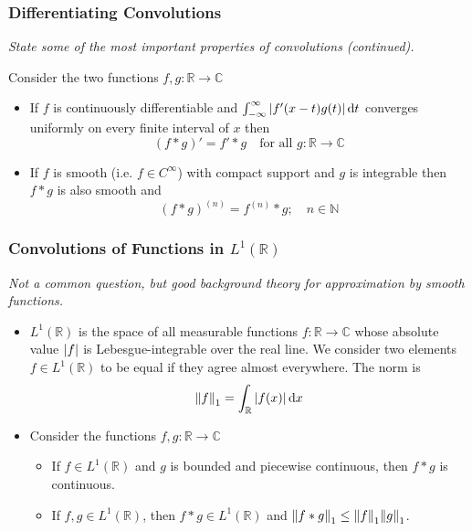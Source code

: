 \documentclass[11pt, a4paper]{article}
\newcommand{\question}[1]{\textit{#1}\vspace{2mm}}
\newcommand{\R}{\mathbb{R}} %
\newcommand{\C}{\mathbb{C}} %
\newcommand{\diff}{\mathop{}\!\mathrm{d}} %
\begin{document}
\subsubsection{Differentiating Convolutions}
\question{State some of the most important properties of convolutions (continued).}

Consider the two functions $ f, g:\R \to \C $ 
\begin{itemize}
	\item If $ f $ is continuously differentiable and $ \int_{-\infty}^{\infty} \abs{f'(x-t)g(t)}\diff t$ converges uniformly on every finite interval of $ x $ then 
	\begin{equation*}
		(f*g)' = f'*g \quad \text{for all } g:\R \to \C
	\end{equation*}
	
	\item If $ f $ is smooth (i.e. $ f \in C^{\infty} $) with compact support and $ g $ is integrable then $ f*g $ is also smooth and
	\begin{equation*}
		(f*g)^{(n)} = f^{(n)} * g; \quad n \in \mathbb{N}
	\end{equation*}
\end{itemize}



\subsubsection{Convolutions of Functions in $ L^1(\R) $}
\question{Not a common question, but good background theory for approximation by smooth functions.}
\begin{itemize}
	\item 	$ L^1(\R) $ is the space of all measurable functions $ f : \R \to \C $ whose absolute value $ \abs{f} $ is Lebesgue-integrable over the real line. We consider two elements $ f \in L^{1}(\R) $ to be equal if they agree almost everywhere. The norm is
	\begin{equation*}
		\norm{f}_{1} = \int_{\R}\abs{f(x)} \diff x
	\end{equation*}
	
	\item Consider the functions $ f, g: \R \to \C $
	\begin{itemize}
		\item If $ f \in L^1(\R) $ and $ g $ is bounded and piecewise continuous, then $ f*g $ is continuous.
		
		\item If $ f, g \in L^1(\R) $, then $ f * g \in L^1(\R) $ and $ \displaystyle{\norm{f*g}_1 \leq \norm{f}_1 \norm{g}_1} $.
		
	
	\end{itemize}
\end{itemize}
\end{document}
